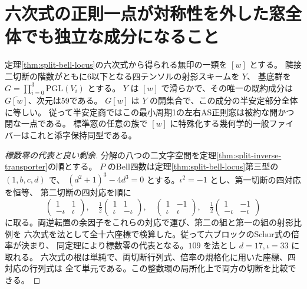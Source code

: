\section{六次式の正則一点が対称性を外した窓全体でも独立な成分になること}
\label{sec:isolated-split-component}
\begin{theorem}\label{thm:isolated-split-component}
定理\ref{thm:split-bell-locus}の六次式から得られる無印の一類を $[w]$ とする。
隣接二切断の階数がともに6以下となる四テンソルの射影スキームを $Y$、
基底群を $G=\prod_{i=0}^3\mathrm{PGL}(V_i)$ とする。
$Y$ は $[w]$ で滑らかで、その唯一の既約成分は $\overline{G[w]}$、次元は59である。
$G[w]$ は $Y$ の開集合で、この成分の半安定部分全体に等しい。
従って半安定商ではこの最小周期1の左右AS正則窓は被約な開かつ閉な一点である。
標準窓の任意の族で $[w]$ に特殊化する幾何学的一般ファイバーはこれと添字保持同型である。
\end{theorem}
\begin{proof}[標数零の代表と良い剰余]
分解の八つの二文字空間を定理\ref{thm:split-inverse-transporter}の順とする。
$P$ のBell四数は定理\ref{thm:split-bell-locus}第三型の $(1,b,c,d)$ で、
$(d^2+1)^3-4d^3=0$ とする。$\iota^2=-1$ とし、第一切断の四対応を恒等、
第二切断の四対応を順に
\[
 \begin{pmatrix}1&1\\-\iota&\iota\end{pmatrix},\quad
 \tfrac12\begin{pmatrix}1&1\\\iota&-\iota\end{pmatrix},\quad
 \begin{pmatrix}1&-1\\\iota&\iota\end{pmatrix},\quad
 \tfrac12\begin{pmatrix}1&-1\\-\iota&-\iota\end{pmatrix}
\]
に取る。両逆転置の余因子をこれらの対応で運び、第二の組と第一の組の射影比例を
六次式を法として全十六座標で検算した。従って六ブロックのSchur式の倍率が決まり、
同定理により標数零の代表となる。$109$ を法とし $d=17,\iota=33$ に取れる。
六次式の根は単純で、両切断行列式、倍率の規格化に用いた座標、四対応の行列式は
全て単元である。この整数環の局所化上で両方の切断を比較できる。
\end{proof}
